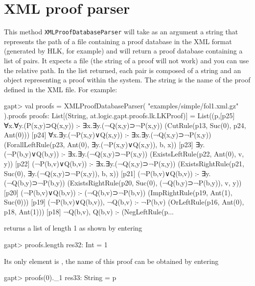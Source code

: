 \documentclass[a4paper,11pt]{article}
\newcommand{\cli}[1]{{\ttfamily {#1}}}
\begin{document}
\begin{appendix}
\begin{clilisting}
\end{clilisting}

\section{XML proof parser}\label{sec.fileio}

This method \texttt{XMLProofDatabaseParser} will take as an argument a string that represents the path of a file
containing a proof database in the XML format (generated by HLK, for example) and
will return a proof database containing a list
of pairs. It expects a file (the string of a proof will not work) and you can use
the relative path. In the list returned, each pair is composed of a string and
an object representing a proof within the system. The string is the name of the
proof defined in the XML file. For example:
%
\begin{clilisting}
gapt> val proofs = XMLProofDatabaseParser( "examples/simple/fol1.xml.gz" ).proofs
proofs: List[(String, at.logic.gapt.proofs.lk.LKProof)] =
List((p,[p25] ∀x.∀y.(P(x,y)⊃Q(x,y)) :- ∃x.∃y.(¬Q(x,y)⊃¬P(x,y))    (CutRule(p13, Suc(0), p24, Ant(0)))
[p24] ∀x.∃y.(¬P(x,y)∨Q(x,y)) :- ∃x.∃y.(¬Q(x,y)⊃¬P(x,y))    (ForallLeftRule(p23, Ant(0), ∃y.(¬P(x,y)∨Q(x,y)), b, x))
[p23] ∃y.(¬P(b,y)∨Q(b,y)) :- ∃x.∃y.(¬Q(x,y)⊃¬P(x,y))    (ExistsLeftRule(p22, Ant(0), v, y))
[p22] (¬P(b,v)∨Q(b,v)) :- ∃x.∃y.(¬Q(x,y)⊃¬P(x,y))    (ExistsRightRule(p21, Suc(0), ∃y.(¬Q(x,y)⊃¬P(x,y)), b, x))
[p21] (¬P(b,v)∨Q(b,v)) :- ∃y.(¬Q(b,y)⊃¬P(b,y))    (ExistsRightRule(p20, Suc(0), (¬Q(b,y)⊃¬P(b,y)), v, y))
[p20] (¬P(b,v)∨Q(b,v)) :- (¬Q(b,v)⊃¬P(b,v))    (ImpRightRule(p19, Ant(1), Suc(0)))
[p19] (¬P(b,v)∨Q(b,v)), ¬Q(b,v) :- ¬P(b,v)    (OrLeftRule(p16, Ant(0), p18, Ant(1)))
[p18] ¬Q(b,v), Q(b,v) :-     (NegLeftRule(p...
\end{clilisting}
%
returns a list of length 1 as shown by entering
%
\begin{clilisting}
gapt> proofs.length
res32: Int = 1

\end{clilisting}
%
Its only element is \cli{proofs(0)}, the name of this proof can be obtained by
entering
%
\begin{clilisting}
gapt> proofs(0)._1
res33: String = p


\end{clilisting}
\end{appendix}
\end{document}
